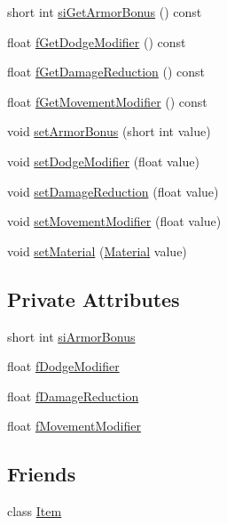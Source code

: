 \begin{DoxyCompactItemize}
\item 
short int \mbox{\hyperlink{class_armor_a72b3d5c0294e80243ed8c96dbc35ccc7}{si\+Get\+Armor\+Bonus}} () const
\item 
float \mbox{\hyperlink{class_armor_a2eab88550e74345eef13e2a279a2f995}{f\+Get\+Dodge\+Modifier}} () const
\item 
float \mbox{\hyperlink{class_armor_a2ac47305b38298494fae82c69c935fba}{f\+Get\+Damage\+Reduction}} () const
\item 
float \mbox{\hyperlink{class_armor_a788fee5745a82a7ffc587aa4938200dc}{f\+Get\+Movement\+Modifier}} () const
\item 
void \mbox{\hyperlink{class_armor_a14c15f72741f2a3dec28c746b3678c20}{set\+Armor\+Bonus}} (short int value)
\item 
void \mbox{\hyperlink{class_armor_ab48309e3f16d226d56af617c65350698}{set\+Dodge\+Modifier}} (float value)
\item 
void \mbox{\hyperlink{class_armor_a08f926ae8438bae04058c22b098c6fcf}{set\+Damage\+Reduction}} (float value)
\item 
void \mbox{\hyperlink{class_armor_a99475fc688add41f89b7fef160534e33}{set\+Movement\+Modifier}} (float value)
\item 
void \mbox{\hyperlink{class_armor_a1710521cbba1bf9328e969cbbc8cdbf3}{set\+Material}} (\mbox{\hyperlink{class_material}{Material}} value)
\end{DoxyCompactItemize}
\subsection*{Private Attributes}
\begin{DoxyCompactItemize}
\item 
short int \mbox{\hyperlink{class_armor_a2ebccb72313c650ec1b8bafec4e82dc2}{si\+Armor\+Bonus}}
\item 
float \mbox{\hyperlink{class_armor_aed2f98ba9acefdb67ac75104c55ea266}{f\+Dodge\+Modifier}}
\item 
float \mbox{\hyperlink{class_armor_acc29c5818b294aaaa11d8d1621b7dd19}{f\+Damage\+Reduction}}
\item 
float \mbox{\hyperlink{class_armor_aa71e430d9308cfe64b5168014c063722}{f\+Movement\+Modifier}}
\end{DoxyCompactItemize}
\subsection*{Friends}
\begin{DoxyCompactItemize}
\item 
class \mbox{\hyperlink{class_armor_aad85754f188b769ff61150eaf36106c4}{Item}}
\end{DoxyCompactItemize}
